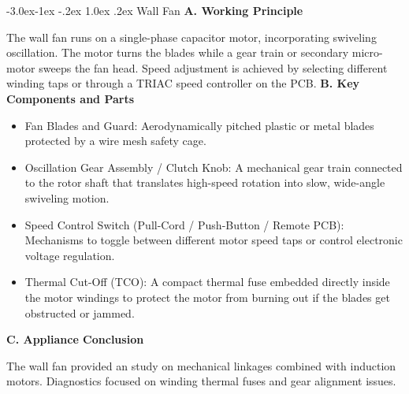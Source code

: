 \documentclass[11pt,a4paper]{report}
\makeatletter
\renewcommand{\subsection}{\@startsection{subsection}{2}{\z@}%
  {-3.0ex\@plus -1ex \@minus -.2ex}%
  {1.0ex \@plus .2ex}%
  {\normalfont\large\bfseries\color{secondaryColor}}}
\makeatother
\begin{document}
\subsection{Wall Fan}
\noindent\textbf{A. Working Principle}\par\medskip
The wall fan runs on a single-phase capacitor motor, incorporating swiveling oscillation. The motor turns the blades while a gear train or secondary micro-motor sweeps the fan head. Speed adjustment is achieved by selecting different winding taps or through a TRIAC speed controller on the PCB.
\noindent\textbf{B. Key Components and Parts}\par\medskip
\begin{itemize}
  \item Fan Blades and Guard: Aerodynamically pitched plastic or metal blades protected by a wire mesh safety cage.
  \item Oscillation Gear Assembly / Clutch Knob: A mechanical gear train connected to the rotor shaft that translates high-speed rotation into slow, wide-angle swiveling motion.
  \item Speed Control Switch (Pull-Cord / Push-Button / Remote PCB): Mechanisms to toggle between different motor speed taps or control electronic voltage regulation.
  \item Thermal Cut-Off (TCO): A compact thermal fuse embedded directly inside the motor windings to protect the motor from burning out if the blades get obstructed or jammed.
\end{itemize}
\noindent\textbf{C. Appliance Conclusion}\par\medskip
The wall fan provided an study on mechanical linkages combined with induction motors. Diagnostics focused on winding thermal fuses and gear alignment issues.
\end{document}
